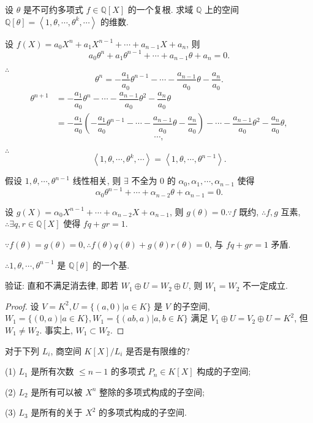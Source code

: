 \documentclass[color=black,device=normal,lang=cn,mode=geye]{elegantnote}
\begin{document}
\begin{exercise}%
    设 $\theta$ 是不可约多项式 $f\in\mathbb{Q}[X]$ 的一个复根. 求域 $\mathbb{Q}$ 上的空间 $\mathbb{Q}[\theta]=\left<1,\theta,\cdots,\theta^k,\cdots\right>$ 的维数.
\end{exercise}
\begin{solution}
    设 $f(X)=a_0X^n+a_1X^{n-1}+\cdots+a_{n-1}X+a_n$, 则
    \[a_0\theta^n+a_1\theta^{n-1}+\cdots+a_{n-1}\theta+a_n=0.\]
    
    $\therefore$
    \[\theta^n=-\dfrac{a_1}{a_0}\theta^{n-1}-\cdots-\dfrac{a_{n-1}}{a_0}\theta-\dfrac{a_n}{a_0}.\]
    \begin{align*}
        \theta^{n+1} & =-\dfrac{a_1}{a_0}\theta^n-\cdots-\dfrac{a_{n-1}}{a_0}\theta^2-\dfrac{a_n}{a_0}\theta \\
        & =-\dfrac{a_1}{a_0}\left(-\dfrac{a_1}{a_0}\theta^{n-1}-\cdots-\dfrac{a_{n-1}}{a_0}\theta-\dfrac{a_n}{a_0}\right)-\cdots-\dfrac{a_{n-1}}{a_0}\theta^2-\dfrac{a_n}{a_0}\theta,
    \end{align*}
    \[\cdots,\]

    $\therefore$
    \[\left<1,\theta,\cdots,\theta^k,\cdots\right>=\left<1,\theta,\cdots,\theta^{n-1}\right>.\]

    假设 $1,\theta,\cdots,\theta^{n-1}$ 线性相关, 则 $\exists$ 不全为 $0$ 的 $\alpha_0,\alpha_1,\cdots,\alpha_{n-1}$ 使得
    \[\alpha_0\theta^{n-1}+\cdots+\alpha_{n-2}\theta+\alpha_{n-1}=0.\]

    设 $g(X)=\alpha_0X^{n-1}+\cdots+\alpha_{n-2}X+\alpha_{n-1}$, 则 $g(\theta)=0.\because f$ 既约, $\therefore f,g$ 互素, $\therefore\exists q,r\in\mathbb{Q}[X]$ 使得 $fq+gr=1$.

    $\because f(\theta)=g(\theta)=0,\therefore f(\theta)q(\theta)+g(\theta)r(\theta)=0$, 与 $fq+gr=1$ 矛盾.

    $\therefore1,\theta,\cdots,\theta^{n-1}$ 是 $\mathbb{Q}[\theta]$ 的一个基.
\end{solution}
\begin{exercise}%
    验证: 直和不满足消去律, 即若 $W_1\oplus U=W_2\oplus U$, 则 $W_1=W_2$ 不一定成立.
\end{exercise}
\begin{proof}
    设 $V=K^2,U=\{(a,0)|a\in K\}$ 是 $V$ 的子空间, $W_1=\{(0,a)|a\in K\},W_1=\{(ab,a)|a,b\in K\}$ 满足 $V_1\oplus U=V_2\oplus U=K^2$, 但 $W_1\neq W_2$. 事实上, $W_1\subset W_2$.
\end{proof}
\begin{exercise}%
    对于下列 $L_i$, 商空间 $K[X]/L_i$ 是否是有限维的?

    (1) $L_1$ 是所有次数 $\leq n-1$ 的多项式 $P_n\in K[X]$ 构成的子空间;

    (2) $L_2$ 是所有可以被 $X^n$ 整除的多项式构成的子空间;

    (3) $L_3$ 是所有的关于 $X^2$ 的多项式构成的子空间.
\end{exercise}
\end{document}
